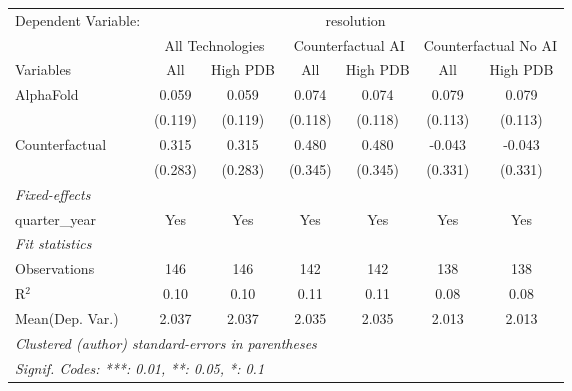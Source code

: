\begingroup
\centering
\begin{tabular}{lcccccc}
   \tabularnewline \midrule \midrule
   Dependent Variable: & \multicolumn{6}{c}{resolution}\\
 & \multicolumn{2}{c}{All Technologies} & \multicolumn{2}{c}{Counterfactual AI} & \multicolumn{2}{c}{Counterfactual No AI} \\
\cmidrule(lr){1-1}\cmidrule(lr){2-3} \cmidrule(lr){4-5} \cmidrule(lr){6-7}
Variables & \multicolumn{1}{c}{All} & \multicolumn{1}{c}{High PDB} & \multicolumn{1}{c}{All} & \multicolumn{1}{c}{High PDB} & \multicolumn{1}{c}{All} & \multicolumn{1}{c}{High PDB} \\
\cmidrule(lr){1-1}\cmidrule(lr){2-2} \cmidrule(lr){3-3} \cmidrule(lr){4-4} \cmidrule(lr){5-5} \cmidrule(lr){6-6} \cmidrule(lr){7-7}
   AlphaFold      & 0.059   & 0.059   & 0.074   & 0.074   & 0.079   & 0.079\\   
                  & (0.119) & (0.119) & (0.118) & (0.118) & (0.113) & (0.113)\\   
   Counterfactual & 0.315   & 0.315   & 0.480   & 0.480   & -0.043  & -0.043\\   
                  & (0.283) & (0.283) & (0.345) & (0.345) & (0.331) & (0.331)\\   
   \midrule
   \emph{Fixed-effects}\\
   quarter\_year  & Yes     & Yes     & Yes     & Yes     & Yes     & Yes\\  
   \midrule
   \emph{Fit statistics}\\
   Observations   & 146     & 146     & 142     & 142     & 138     & 138\\  
   R$^2$          & 0.10    & 0.10    & 0.11    & 0.11    & 0.08    & 0.08\\  
Mean(Dep. Var.) & 2.037 & 2.037 & 2.035 & 2.035 & 2.013 & 2.013 \\
   \midrule \midrule
   \multicolumn{7}{l}{\emph{Clustered (author) standard-errors in parentheses}}\\
   \multicolumn{7}{l}{\emph{Signif. Codes: ***: 0.01, **: 0.05, *: 0.1}}\\
\end{tabular}
\par\endgroup
